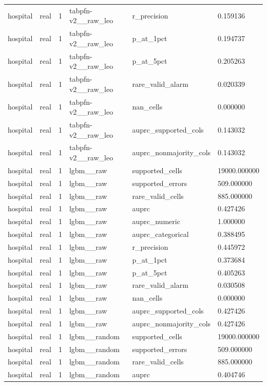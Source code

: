 \begin{tabular}{llllll}
hospital & real & 1 & tabpfn-v2\_\_raw\_leo & r\_precision & 0.159136 \\
hospital & real & 1 & tabpfn-v2\_\_raw\_leo & p\_at\_1pct & 0.194737 \\
hospital & real & 1 & tabpfn-v2\_\_raw\_leo & p\_at\_5pct & 0.205263 \\
hospital & real & 1 & tabpfn-v2\_\_raw\_leo & rare\_valid\_alarm & 0.020339 \\
hospital & real & 1 & tabpfn-v2\_\_raw\_leo & nan\_cells & 0.000000 \\
hospital & real & 1 & tabpfn-v2\_\_raw\_leo & auprc\_supported\_cols & 0.143032 \\
hospital & real & 1 & tabpfn-v2\_\_raw\_leo & auprc\_nonmajority\_cols & 0.143032 \\
hospital & real & 1 & lgbm\_\_raw & supported\_cells & 19000.000000 \\
hospital & real & 1 & lgbm\_\_raw & supported\_errors & 509.000000 \\
hospital & real & 1 & lgbm\_\_raw & rare\_valid\_cells & 885.000000 \\
hospital & real & 1 & lgbm\_\_raw & auprc & 0.427426 \\
hospital & real & 1 & lgbm\_\_raw & auprc\_numeric & 1.000000 \\
hospital & real & 1 & lgbm\_\_raw & auprc\_categorical & 0.388495 \\
hospital & real & 1 & lgbm\_\_raw & r\_precision & 0.445972 \\
hospital & real & 1 & lgbm\_\_raw & p\_at\_1pct & 0.373684 \\
hospital & real & 1 & lgbm\_\_raw & p\_at\_5pct & 0.405263 \\
hospital & real & 1 & lgbm\_\_raw & rare\_valid\_alarm & 0.030508 \\
hospital & real & 1 & lgbm\_\_raw & nan\_cells & 0.000000 \\
hospital & real & 1 & lgbm\_\_raw & auprc\_supported\_cols & 0.427426 \\
hospital & real & 1 & lgbm\_\_raw & auprc\_nonmajority\_cols & 0.427426 \\
hospital & real & 1 & lgbm\_\_random & supported\_cells & 19000.000000 \\
hospital & real & 1 & lgbm\_\_random & supported\_errors & 509.000000 \\
hospital & real & 1 & lgbm\_\_random & rare\_valid\_cells & 885.000000 \\
hospital & real & 1 & lgbm\_\_random & auprc & 0.404746 \\

\end{tabular}
